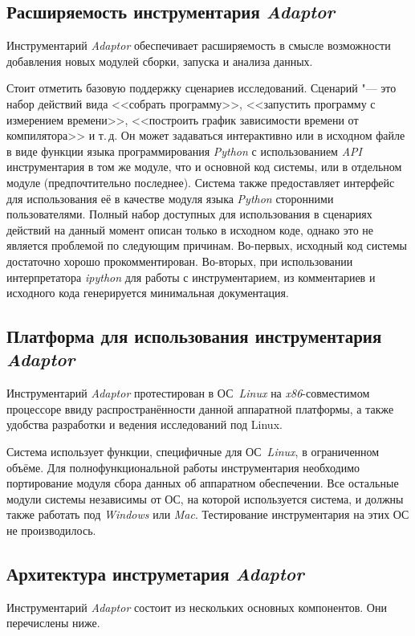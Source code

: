 \subsection{Расширяемость инструментария \textit{Adaptor}}
Инструментарий \textit{Adaptor} обеспечивает расширяемость в смысле возможности добавления новых модулей сборки, запуска и анализа данных.

Стоит отметить базовую поддержку сценариев исследований. Сценарий "--- это набор действий вида <<собрать программу>>, <<запустить программу с измерением времени>>, <<построить график зависимости времени от компилятора>> и т.\,д. Он может задаваться интерактивно или в исходном файле в виде функции языка программирования \textit{Python} с использованием \textit{API} инструментария в том же модуле, что и основной код системы, или в отдельном модуле (предпочтительно последнее). Система также предоставляет интерфейс для использования её в качестве модуля языка \textit{Python} сторонними пользователями. Полный набор доступных для использования в сценариях действий на данный момент описан только в исходном коде, однако это не является проблемой по следующим причинам. Во-первых, исходный код системы достаточно хорошо прокомментирован. Во-вторых, при использовании интерпретатора \textit{ipython} для работы с инструментарием, из комментариев и исходного кода генерируется минимальная документация.


\subsection{Платформа для использования инструментария \textit{Adaptor}}
Инструментарий \textit{Adaptor} протестирован в ОС~\textit{Linux} на \textit{x86}-совместимом процессоре ввиду распространённости данной аппаратной платформы, а также удобства разработки и ведения исследований под Linux.

Система использует функции, специфичные для ОС~\textit{Linux}, в ограниченном объёме. Для полнофункциональной работы инструментария необходимо портирование модуля сбора данных об аппаратном обеспечении. Все остальные модули системы независимы от ОС, на которой используется система, и должны также работать под \textit{Windows} или \textit{Mac}. Тестирование инструментария на этих ОС не производилось.


\subsection{Архитектура инструметария \textit{Adaptor}}
Инструментарий \textit{Adaptor} состоит из нескольких основных компонентов. Они перечислены ниже.

